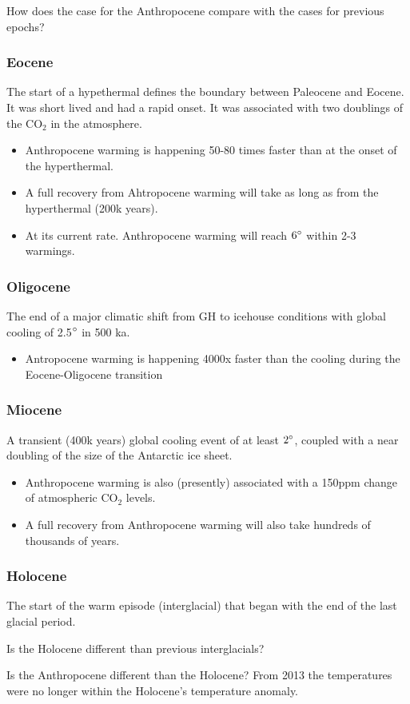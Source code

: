 How does the case for the Anthropocene compare with the cases for previous
epochs?

\subsubsection{Eocene}

The start of a hypethermal defines the boundary between Paleocene and Eocene.
It was short lived and had a rapid onset. It was associated with two doublings
of the CO$_2$ in the atmosphere.
\begin{itemize}
	\item Anthropocene warming is happening 50-80 times faster than at the
	 onset of the hyperthermal.
	\item A full recovery from Ahtropocene warming will take as long as
	 from the hyperthermal (200k years).
	\item At its current rate. Anthropocene warming will reach $6\degree$
	 within 2-3 warmings.
\end{itemize}

\subsubsection{Oligocene}

The end of a major climatic shift from GH to icehouse conditions with global
cooling of 2.5$\degree$ in 500 ka.

\begin{itemize}
	\item Antropocene warming is happening 4000x faster than the cooling
	 during the Eocene-Oligocene transition
\end{itemize}

\subsubsection{Miocene}

A transient (400k years) global cooling event of at least $2\degree$, coupled
with a near doubling of the size of the Antarctic ice sheet.

\begin{itemize}
	\item Anthropocene warming is also (presently) associated with a
	 150ppm change of atmospheric CO$_2$ levels.
	\item A full recovery from Anthropocene warming will also take
	 hundreds of thousands of years.
\end{itemize}

\subsubsection{Holocene}

The start of the warm episode (interglacial) that began with the end of the
last glacial period.

Is the Holocene different than previous interglacials?

Is the Anthropocene different than the Holocene? From 2013 the temperatures
were no longer within the Holocene's temperature anomaly.
